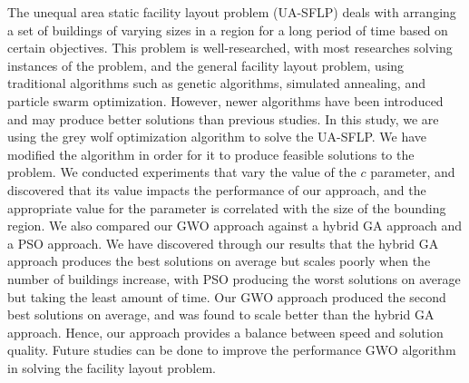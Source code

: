 
The unequal area static facility layout problem (UA-SFLP) deals with arranging a set of buildings of varying sizes in a region for a long period of time based on certain objectives. This problem is well-researched, with most researches solving instances of the problem, and the general facility layout problem, using traditional algorithms such as genetic algorithms, simulated annealing, and particle swarm optimization. However, newer algorithms have been introduced and may produce better solutions than previous studies. In this study, we are using the grey wolf optimization algorithm to solve the UA-SFLP. We have modified the algorithm in order for it to produce feasible solutions to the problem. We conducted experiments that vary the value of the $c$ parameter, and discovered that its value impacts the performance of our approach, and the appropriate value for the parameter is correlated with the size of the bounding region. We also compared our GWO approach against a hybrid GA approach and a PSO approach. We have discovered through our results that the hybrid GA approach produces the best solutions on average but scales poorly when the number of buildings increase, with PSO producing the worst solutions on average but taking the least amount of time. Our GWO approach produced the second best solutions on average, and was found to scale better than the hybrid GA approach. Hence, our approach provides a balance between speed and solution quality. Future studies can be done to improve the performance GWO algorithm in solving the facility layout problem.